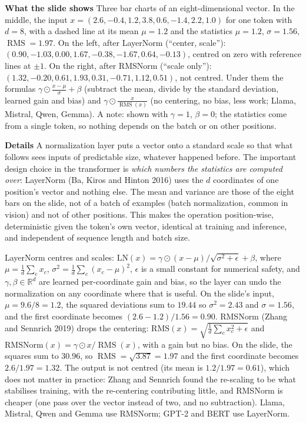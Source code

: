 \documentclass[11pt,letterpaper]{article}
\newcommand{\para}[1]{\medskip\noindent\textbf{#1}\quad}
\DeclareMathOperator{\RMS}{RMS}
\begin{document}
\para{What the slide shows} Three bar charts of an eight-dimensional vector. In the middle, the input $x=(2.6,-0.4,1.2,3.8,0.6,-1.4,2.2,1.0)$ for one token with $d=8$, with a dashed line at its mean $\mu=1.2$ and the statistics $\mu=1.2$, $\sigma=1.56$, $\RMS=1.97$. On the left, after LayerNorm (``center, scale''): $(0.90,-1.03,0.00,1.67,-0.38,-1.67,0.64,-0.13)$, centred on zero with reference lines at $\pm1$. On the right, after RMSNorm (``scale only''): $(1.32,-0.20,0.61,1.93,0.31,-0.71,1.12,0.51)$, not centred. Under them the formulas $\gamma\odot\frac{x-\mu}{\sigma}+\beta$ (subtract the mean, divide by the standard deviation, learned gain and bias) and $\gamma\odot\frac{x}{\RMS(x)}$ (no centering, no bias, less work; Llama, Mistral, Qwen, Gemma). A note: shown with $\gamma=1$, $\beta=0$; the statistics come from a single token, so nothing depends on the batch or on other positions.

\para{Details} A normalization layer puts a vector onto a standard scale so that what follows sees inputs of predictable size, whatever happened before. The important design choice in the transformer is \emph{which numbers the statistics are computed over}: LayerNorm (Ba, Kiros and Hinton 2016) uses the $d$ coordinates of one position's vector and nothing else. The mean and variance are those of the eight bars on the slide, not of a batch of examples (batch normalization, common in vision) and not of other positions. This makes the operation position-wise, deterministic given the token's own vector, identical at training and inference, and independent of sequence length and batch size.

LayerNorm centres and scales: $\mathrm{LN}(x)=\gamma\odot(x-\mu)/\sqrt{\sigma^2+\epsilon}+\beta$, where $\mu=\frac1d\sum_cx_c$, $\sigma^2=\frac1d\sum_c(x_c-\mu)^2$, $\epsilon$ is a small constant for numerical safety, and $\gamma,\beta\in\mathbb{R}^d$ are learned per-coordinate gain and bias, so the layer can undo the normalization on any coordinate where that is useful. On the slide's input, $\mu=9.6/8=1.2$, the squared deviations sum to $19.44$ so $\sigma^2=2.43$ and $\sigma=1.56$, and the first coordinate becomes $(2.6-1.2)/1.56=0.90$. RMSNorm (Zhang and Sennrich 2019) drops the centering: $\mathrm{RMS}(x)=\sqrt{\frac1d\sum_cx_c^2+\epsilon}$ and $\mathrm{RMSNorm}(x)=\gamma\odot x/\RMS(x)$, with a gain but no bias. On the slide, the squares sum to $30.96$, so $\RMS=\sqrt{3.87}=1.97$ and the first coordinate becomes $2.6/1.97=1.32$. The output is not centred (its mean is $1.2/1.97=0.61$), which does not matter in practice: Zhang and Sennrich found the re-scaling to be what stabilises training, with the re-centering contributing little, and RMSNorm is cheaper (one pass over the vector instead of two, and no subtraction). Llama, Mistral, Qwen and Gemma use RMSNorm; GPT-2 and BERT use LayerNorm.
\end{document}
